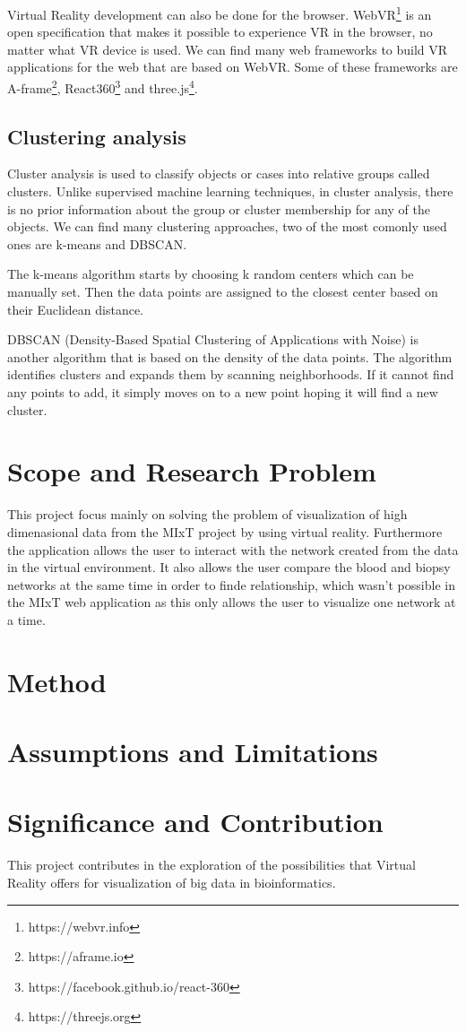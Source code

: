 Virtual Reality development can also be done for the browser. WebVR\footnote{https://webvr.info} is an open specification that makes it possible to experience VR in the browser, no matter what VR device is used. We can find many web frameworks to build VR applications for the web that are based on WebVR. Some of these frameworks are A-frame\footnote{https://aframe.io}, React360\footnote{https://facebook.github.io/react-360} and three.js\footnote{https://threejs.org}.

\subsection{Clustering analysis}
Cluster analysis is used to classify objects or cases into relative groups called clusters. Unlike supervised machine learning techniques, in cluster analysis, there is no prior information about the group or cluster membership for any of the objects. We can find many clustering approaches, two of the most comonly used ones are k-means and DBSCAN.

The k-means algorithm starts by choosing k random centers which can be manually set. Then the data points are assigned to the closest center based on their Euclidean distance.

DBSCAN (Density-Based Spatial Clustering of Applications with Noise) is another algorithm that is based on the density of the data points. The algorithm identifies clusters and expands them by scanning neighborhoods. If it cannot find any points to add, it simply moves on to a new point hoping it will find a new cluster.

\section{Scope and Research Problem}
This project focus mainly on solving the problem of visualization of high dimenasional data from the MIxT project by using virtual reality. Furthermore the application allows the user to interact with the network created from the data in the virtual environment. It also allows the user compare the blood and biopsy networks at the same time in order to finde relationship, which wasn't possible in the MIxT web application as this only allows the user to visualize one network at a time.

\section{Method}

\section{Assumptions and Limitations}

\section{Significance and Contribution}
This project contributes in the exploration of the possibilities that Virtual Reality offers for visualization of big data in bioinformatics.
